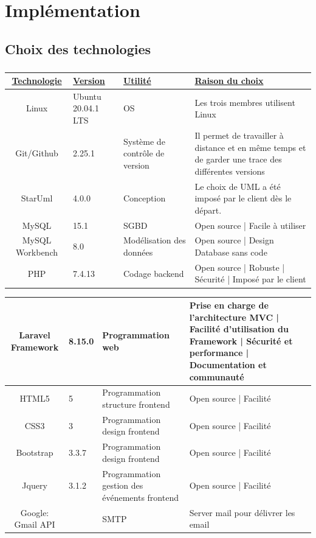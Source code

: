 \chapter{Implémentation}
        \section{Choix des technologies} 
        \paragraph{} 
\begin{tabular}{|c|p{1.5cm}|p{2.7cm}|p{4cm}|}
        \hline
        \textbf{\underline{Technologie}} & \textbf{\underline{Version}} & 
        \textbf{\underline{Utilité}} & \textbf{\underline{Raison du choix}} \\
        \hline
        Linux & Ubuntu 20.04.1 LTS & OS & Les trois membres utilisent Linux \\
        \hline
        Git/Github & 2.25.1 & Système de contrôle de version & Il permet de travailler à distance et en même temps et de garder une trace des différentes versions\\
        \hline 
        StarUml & 4.0.0 & Conception & Le choix de UML a été imposé par le client dès le départ. \\
        \hline 
        MySQL & 15.1 & SGBD & Open source | Facile à utiliser\\
        \hline 
        MySQL Workbench & 8.0 & Modélisation des données & Open source | Design Database sans code\\
        \hline
        PHP & 7.4.13 & Codage backend & Open source | Robuste | Sécurité | Imposé par le client\\
        \hline
\end{tabular}
\begin{tabular}{|c|p{1.5cm}|p{2.7cm}|p{4cm}|}
        \hline
        Laravel Framework & 8.15.0 & Programmation web & Prise en charge de l’architecture MVC | Facilité d’utilisation du Framework | Sécurité et performance | Documentation et communauté\\
        \hline
        HTML5 & 5 & Programmation structure frontend & Open source | Facilité\\
        \hline
        CSS3 & 3 & Programmation design frontend & Open source | Facilité\\
        \hline
        Bootstrap & 3.3.7 & Programmation design frontend & Open source | Facilité\\
        \hline
        Jquery & 3.1.2 & Programmation gestion des événements frontend & Open source | Facilité\\
        \hline
        Google: Gmail API &  & SMTP & Server mail pour délivrer les email\\
        \hline
\end{tabular}

